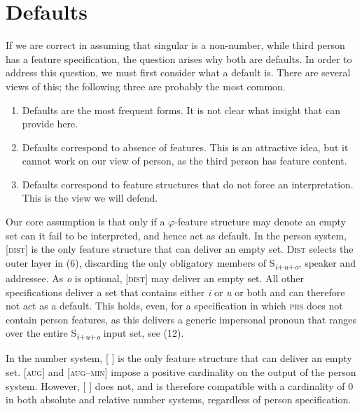 \documentclass[output=paper]{langsci/langscibook}
\begin{document}
\section{Defaults}

If we are correct in assuming that singular is a non-number, while third person has a feature specification, the question arises why both are defaults. In order to address this question, we must first consider what a default is. There are several views of this; the following three are probably the most common. 

\begin{enumerate}[label=(\roman*)]
\item Defaults are the most frequent forms. It is not clear what insight that can provide here. 
\item Defaults correspond to absence of features. This is an attractive idea, but it cannot work on our view of person, as the third person has feature content. 
\item Defaults correspond to feature structures that do not force an interpretation. This is the view we will defend.
\end{enumerate}

  Our core assumption is that only if a $\varphi $-feature structure may denote an empty set can it fail to be interpreted, and hence act as default. In the person system, [\textsc{dist}] is the only feature structure that can deliver an empty set. \textsc{Dist} selects the outer layer in (6), discarding the only obligatory members of S\textit{\textsubscript{i}}\textsubscript{+}\textit{\textsubscript{u}}\textsubscript{+}\textit{\textsubscript{o}}, speaker and addressee. As \textit{o} is optional, [\textsc{dist}] may deliver an empty set. All other specifications deliver a set that contains either \textit{i} or \textit{u} or both and can therefore not act as a default. This holds, even, for a specification in which \textsc{prs} does not contain person features, as this delivers a generic impersonal pronoun that ranges over the entire S\textit{\textsubscript{i}}\textsubscript{+}\textit{\textsubscript{u}}\textsubscript{+}\textit{\textsubscript{o}} input set, see (12).

In the number system, [ ] is the only feature structure that can deliver an empty set. [\textsc{aug}] and [\textsc{aug}–\textsc{min}] impose a positive cardinality on the output of the person system. However, [ ] does not, and is therefore compatible with a cardinality of 0 in both absolute and relative number systems, regardless of person specification. 
\end{document}
